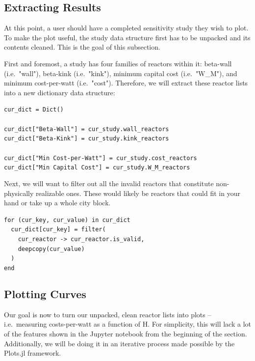 \subsection{Extracting Results}

At this point, a user should have a completed sensitivity study they wish to plot. To make the plot useful, the study data structure first has to be unpacked and its contents cleaned. This is the goal of this subsection.

First and foremost, a study has four families of reactors within it: beta-wall (i.e.\ "wall"), beta-kink (i.e.\ "kink"), minimum capital cost (i.e.\ "W\_M"), and minimum cost-per-watt (i.e.\ "cost"). Therefore, we will extract these reactor lists into a new dictionary data structure:

\begin{addmargin}[1.5em]{1.5em}
\texttt{cur\_dict = Dict() \\ ~ \\
cur\_dict["Beta-Wall"] = cur\_study.wall\_reactors \\
cur\_dict["Beta-Kink"] = cur\_study.kink\_reactors \\ ~ \\
cur\_dict["Min Cost-per-Watt"] = cur\_study.cost\_reactors \\
cur\_dict["Min Capital Cost"] = cur\_study.W\_M\_reactors
}
\end{addmargin}

Next, we will want to filter out all the invalid reactors that constitute non-physically realizable ones. These would likely be reactors that could fit in your hand or take up a whole city block.

\begin{addmargin}[1.5em]{1.5em}
\texttt{for (cur\_key, cur\_value) in cur\_dict \\
\-\ \-\ cur\_dict[cur\_key] = filter( \\
\-\ \-\ \-\ \-\ cur\_reactor -> cur\_reactor.is\_valid, \\
\-\ \-\ \-\ \-\ deepcopy(cur\_value) \\
\-\ \-\ ) \\
end
}
\end{addmargin}

\subsection{Plotting Curves}

Our goal is now to turn our unpacked, clean reactor lists into plots -- i.e.\ measuring costs-per-watt as a function of H. For simplicity, this will lack a lot of the features shown in the Jupyter notebook from the beginning of the section. Additionally, we will be doing it in an iterative process made possible by the Plots.jl framework.

